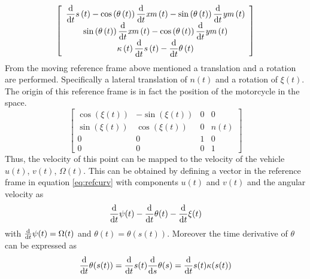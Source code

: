 \begin{equation}
    \left[ \begin{array}{c} 
        \displaystyle
        {\frac {\rm d}{{\rm d}t}}s \left( t \right) -\cos \left( \theta \left( t \right)  \right) {\frac {\rm d}{{\rm d}t}}{\it xm} \left( t \right) -\sin \left( \theta \left( t \right) \right) {\frac {\rm d}{{\rm d}t}}{\it ym} \left( t \right) \\
        \displaystyle
        \sin \left( \theta \left( t \right)  \right) {\frac {\rm d}{{\rm d}t}}{\it xm} \left( t \right) -\cos \left( \theta\left( t \right)  \right) {\frac {\rm d}{{\rm d}t}}{\it ym} \left( t\right) \\ 
        \displaystyle
        \kappa \left( t \right) {\frac {\rm d}{{\rm d}t}}s \left( t \right) -{\frac {\rm d}{{\rm d}t}}\theta \left( t\right)
    \end{array} \right]    
\end{equation}
%
From the moving reference frame above mentioned a translation and a rotation are performed. Specifically a lateral translation of $n(t)$ and a rotation of $\xi(t)$. The origin of this reference frame is in fact the position of the motorcycle in the space.
%
\begin{equation}
    \left[ \begin{array}{cccc} 
        \cos \left(\xi \left(t \right)\right)&-\sin \left(\xi \left(t \right)\right)&0&0\\
        \sin \left(\xi \left(t \right)\right)&\cos \left(\xi \left(t \right)\right)&0&n(t)\\
        0&0&1&0\\
        0&0&0&1
    \end{array} \right]  
    \label{eq:refcurv}  
\end{equation}
%
Thus, the velocity of this point can be mapped to the velocity of the vehicle $u(t)$, $v(t)$, $\Omega(t)$. This can be obtained by defining a vector in the reference frame in equation \ref{eq:refcurv} with components $u(t)$ and $v(t)$ and the angular velocity as 
%
\begin{equation}
    \frac{\rm d}{{\rm d}t}\psi(t)-\frac{\rm d}{{\rm d}t}\theta(t)-\frac{\rm d}{{\rm d}t}\xi(t)    
\end{equation}
%
with $\frac{\rm d}{{\rm d}t}\psi(t) = \Omega(t)$ and $\theta(t)=\theta(s(t))$. Moreover the time derivative of $\theta$ can be expressed as 
%
\begin{equation}
    \frac{\rm d}{{\rm d}t}\theta(s(t))=\frac{\rm d}{{\rm d}t}s(t) \frac{\rm d}{{\rm d}s}\theta(s) = \frac{\rm d}{{\rm d}t}s(t) \kappa(s(t))
\end{equation}
